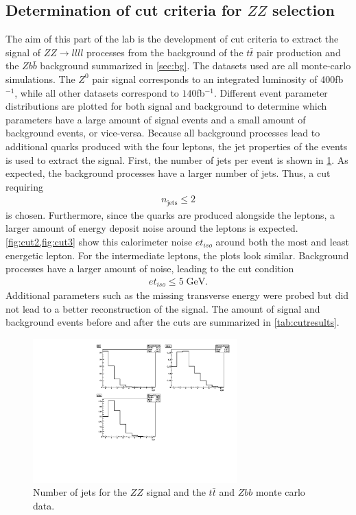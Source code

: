 \documentclass[twoside,        %
               BCOR12mm,       %
               ngerman,english, %
               fleqn,headsepline=false,footsepline=false
              ]{Vorlage/MFPREPORT}
\begin{document}
\subsection{Determination of cut criteria for $ZZ$ selection}
The aim of this part of the lab is the development of cut criteria to extract
the signal of $ZZ\rightarrow llll$ processes from the background of the $t\bar
t$ pair production and the $Z b\bar b$ background summarized in \cref{sec:bg}.
The datasets used are all monte-carlo simulations. The $Z^0$ pair signal
corresponds to an integrated luminosity of 400\;fb$^{-1}$, while all other
datasets correspond to $140$\;fb$^{-1}$. Different event parameter
distributions are plotted for both signal and background to determine which
parameters have a large amount of signal events and a small amount of
background events, or vice-versa. Because all background processes lead
to additional quarks produced with the four leptons, the jet properties of the
events is used to extract the signal. First, the number of jets per event is
shown in \cref{fig:cut1}. As expected, the background processes have a larger
number of jets. Thus, a cut requiring
\begin{align}
n_{\text{jets}}\leq2 
\label{eq:cut1}
\end{align}
is chosen. Furthermore, since the quarks are produced alongside the leptons, a
larger amount of energy deposit noise around the leptons is expected.
\cref{fig:cut2,fig:cut3} show this calorimeter noise $et_{iso}$ around both the most and
least energetic lepton. For the intermediate leptons, the plots look similar.
Background processes have a larger amount of noise, leading to the cut
condition 
\begin{align}
    et_{iso}\leq5\;\text{GeV.}
\label{eq:cut2}
\end{align}
Additional parameters such as the missing transverse energy were probed but did
not lead to a better reconstruction of the signal.
The amount of signal and background events before and after the cuts are
summarized in \cref{tab:cutresults}.
\begin{figure}[h!]
    \begin{center}
        \includegraphics[width=0.7\textwidth]{ZZ/njets_uncut}
    \end{center}
    \caption{Number of jets for the $ZZ$ signal and the $t\bar t$ and $Zbb$
    monte carlo data.}
    \label{fig:cut1}
\end{figure}
\end{document}
